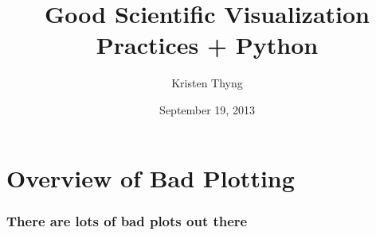 \documentclass[ignorenonframetext]{beamer}
\title[Visualization]{Good Scientific Visualization Practices + Python}
\author{Kristen Thyng}
\date{September 19, 2013}
\institute[Texas A\&M]{ 
	Python in Geosciences}
\begin{document}
\begin{frame}
	\titlepage
\end{frame}

\section{Overview of Bad Plotting}

\begin{frame}[t]\frametitle{There are lots of bad plots out there}
    
    \begin{figure}
    	\centering

\end{figure}
\end{frame}
\end{document}
